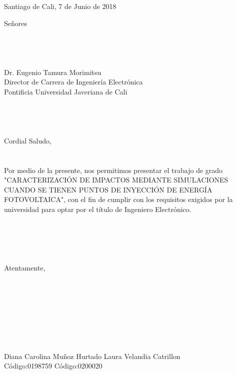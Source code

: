 \begin{flushright}
Santiago de Cali, 7 de Junio de 2018
\end{flushright}
Señores
\\
\\
\\
\\
\\
Dr. Eugenio Tamura Morimitsu\\
Director de Carrera de Ingeniería Electrónica\\
Pontificia Universidad Javeriana de Cali\\
\\
\\
\\
\\
Cordial Saludo,\\\\\\

Por medio de la presente, nos permitimos presentar el trabajo de grado "CARACTERIZACIÓN DE IMPACTOS MEDIANTE SIMULACIONES CUANDO SE TIENEN PUNTOS DE INYECCIÓN DE ENERGÍA FOTOVOLTAICA", con el fin de cumplir con los requisitos exigidos por la universidad para optar por el título de Ingeniero Electrónico.\\
\\
\\
\\
\\
\\
Atentamente,\\\\\\
\\
\\
\\
\\
\\
\\
Diana Carolina Muñoz Hurtado \qquad \qquad \qquad Laura Velandia Catrillon\\
Código:0198759 \qquad \qquad \qquad \qquad \qquad \qquad \quad Código:0200020
\newpage